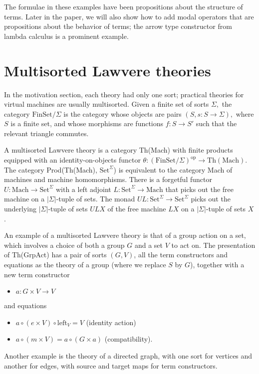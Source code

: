 \documentclass{article}
\newcommand{\maps}{\colon}
\newcommand{\FinSet}{\mathrm{FinSet}}
\newcommand{\Set}{\mathrm{Set}}
\newcommand{\Mach}{\mathrm{Mach}}
\newcommand{\op}{\mathrm{op}}
\begin{document}
The formulae in these examples have been propositions about the structure of terms.  Later in the paper, we will also show how to add modal operators that are propositions about the behavior of terms; the arrow type constructor from lambda calculus is a prominent example.

\section{Multisorted Lawvere theories}
In the motivation section, each theory had only one sort; practical theories for virtual machines are usually multisorted.  Given a finite set of sorts $\Sigma,$ the category $\FinSet/\Sigma$ is the category whose objects are pairs $(S, s\maps S\to \Sigma),$ where $S$ is a finite set, and whose morphisms are functions $f\maps S \to S'$ such that the relevant triangle commutes.

A multisorted Lawvere theory is a category Th(Mach) with finite products equipped with an identity-on-objects functor ${\theta\maps (\FinSet/\Sigma)^\op \to \mathrm{Th(Mach)}.}$  The category Prod(Th(Mach), $\Set^\Sigma$) is equivalent to the category Mach of machines and machine homomorphisms.  There is a forgetful functor ${U\maps \Mach \to \Set^\Sigma}$ with a left adjoint ${L\maps \Set^\Sigma \to \Mach}$ that picks out the free machine on a $|\Sigma|$-tuple of sets.  The monad ${UL\maps \Set^\Sigma \to \Set^\Sigma}$ picks out the underlying $|\Sigma|$-tuple of sets $ULX$ of the free machine $LX$ on a $|\Sigma|$-tuple of sets $X$.

An example of a multisorted Lawvere theory is that of a group action on a set, which involves a choice of both a group $G$ and a set $V$ to act on.  The presentation of Th(GrpAct) has a pair of sorts $(G, V)$, all the term constructors and equations as the theory of a group (where we replace $S$ by $G$), together with a new term constructor
\begin{itemize}
  \item $a\maps G \times V \to V$
\end{itemize}
and equations
\begin{itemize}
  \item $a \circ (e \times V) \circ \mathrm{left}_V = V$ (identity action)
  \item $a \circ (m \times V) = a \circ (G \times a)$ (compatibility).
\end{itemize}

Another example is the theory of a directed graph, with one sort for vertices and another for edges, with source and target maps for term constructors.
\end{document}
